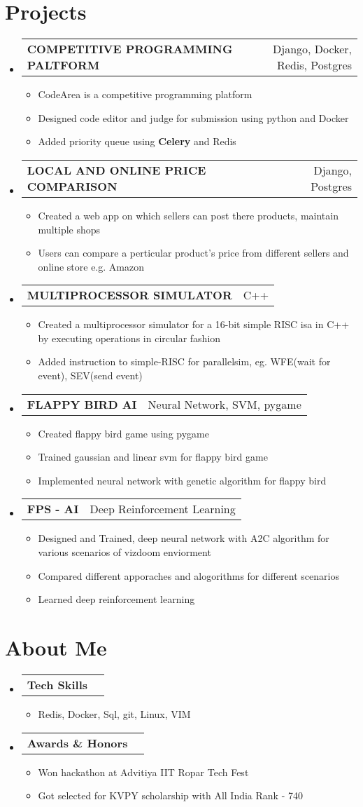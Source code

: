 \documentclass[letterpaper,11pt]{article}
\makeatletter
\newcommand{\resumeSimpleItem}[1]{
    \item\small{
        {#1}
    }
}
\newcommand{\resumeSimpleSubheading}[2]{
  \vspace{-1pt}\item
    \begin{tabular*}{0.97\textwidth}[t]{l@{\extracolsep{\fill}}r}
      \textbf{#1} & #2 \\
    \end{tabular*}\vspace{-5pt}
}
\newcommand{\resumeListTitle}[1]{
    \vspace{-1pt}\item
    \begin{tabular*}{0.97\textwidth}[t]{l@{\extracolsep{\fill}}r}
        \textbf{#1} \\
    \end{tabular*}\vspace{-5pt}
}
\newcommand{\resumeSubHeadingListStart}{\begin{itemize}[leftmargin=*]}
\newcommand{\resumeSubHeadingListEnd}{\end{itemize}}
\newcommand{\resumeItemListStart}{\begin{itemize}}
\newcommand{\resumeItemListEnd}{\end{itemize}\vspace{-5pt}}
\makeatother
\begin{document}
\section{Projects}
  \resumeSubHeadingListStart
    \resumeSimpleSubheading
    {COMPETITIVE PROGRAMMING PALTFORM}{Django, Docker, Redis, Postgres}
    \resumeItemListStart
      \resumeSimpleItem {CodeArea is a competitive programming platform}
      \resumeSimpleItem {Designed code editor and judge for submission using python and Docker}
      \resumeSimpleItem {Added priority queue using \textbf{Celery} and Redis}
    \resumeItemListEnd
    \resumeSimpleSubheading
    {LOCAL AND ONLINE PRICE COMPARISON}{Django, Postgres}
    \resumeItemListStart
        \resumeSimpleItem {Created a web app on which sellers can post there products, maintain multiple shops}
        \resumeSimpleItem {Users can compare a perticular product's price from different sellers and online store e.g. Amazon}
    \resumeItemListEnd
    \resumeSimpleSubheading
    {MULTIPROCESSOR SIMULATOR}{C++}
    \resumeItemListStart
      \resumeSimpleItem {Created a multiprocessor simulator for a 16-bit simple RISC isa in C++ by executing operations in circular fashion}
      \resumeSimpleItem {Added instruction to simple-RISC for parallelsim, eg. WFE(wait for event), SEV(send event)}
    \resumeItemListEnd
    \resumeSimpleSubheading
    {FLAPPY BIRD AI} {Neural Network, SVM, pygame}
    \resumeItemListStart
      \resumeSimpleItem {Created flappy bird game using pygame}
      \resumeSimpleItem {Trained gaussian and linear svm for flappy bird game}
      \resumeSimpleItem {Implemented neural network with genetic algorithm for flappy bird}
    \resumeItemListEnd
    \resumeSimpleSubheading
    {FPS - AI} {Deep Reinforcement Learning}
    \resumeItemListStart
      \resumeSimpleItem {Designed and Trained, deep neural network with A2C algorithm for various scenarios of vizdoom enviorment}
      \resumeSimpleItem {Compared different apporaches and alogorithms for different scenarios}
      \resumeSimpleItem {Learned deep reinforcement learning}
    \resumeItemListEnd
    \resumeSubHeadingListEnd



\section{About Me}
 \resumeSubHeadingListStart
    \resumeListTitle{Tech Skills}
        \resumeItemListStart
            \resumeSimpleItem{Redis, Docker, Sql, git, Linux, VIM}
        \resumeItemListEnd
    \resumeListTitle{Awards \& Honors}
        \resumeItemListStart
            \resumeSimpleItem{Won hackathon at Advitiya IIT Ropar Tech Fest}
            \resumeSimpleItem{Got selected for KVPY scholarship with All India Rank - 740}
        \resumeItemListEnd
 \resumeSubHeadingListEnd
 
\end{document}
